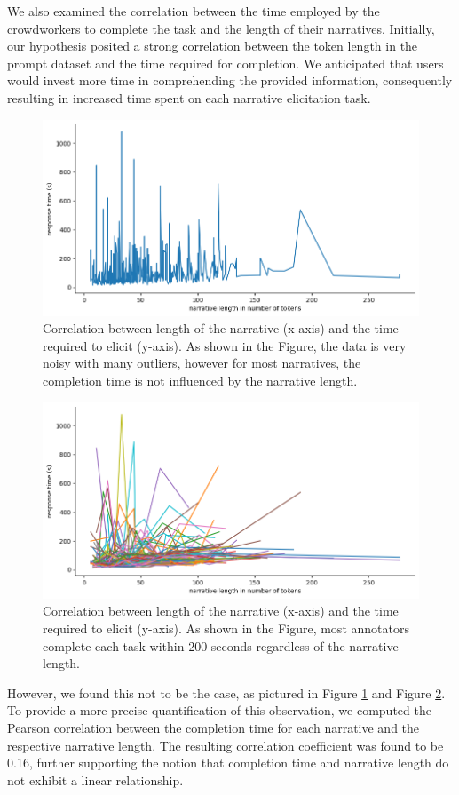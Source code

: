 We also examined the correlation between the time employed by the crowdworkers to complete the task and the length of their narratives. Initially, our hypothesis posited a strong correlation between the token length in the prompt dataset and the time required for completion. We anticipated that users would invest more time in comprehending the provided information, consequently resulting in increased time spent on each narrative elicitation task.
\begin{figure}[!htbp]
    \centering
    \includegraphics[width=1\linewidth]{assets//imgs/dataset-pearson-correlation.png}
    \caption{Correlation between length of the narrative (x-axis) and the time required to elicit (y-axis). As shown in the Figure, the data is very noisy with many outliers, however for most narratives, the completion time is not influenced by the narrative length.}
    \label{fig:dataset-pearson-correlation}
\end{figure}
\begin{figure}[!htbp]
    \centering
        \includegraphics[width=1\linewidth]{assets//imgs/dataset-overall-correlation-workers.png}
        \caption{Correlation between length of the narrative (x-axis) and the time required to elicit (y-axis). As shown in the Figure, most annotators complete each  task within 200 seconds regardless of the narrative length.}
        \label{fig:dataset-overall-correlation-workers}
\end{figure}
However, we found this not to be the case, as pictured in Figure \ref{fig:dataset-pearson-correlation} and Figure \ref{fig:dataset-overall-correlation-workers}. To provide a more precise quantification of this observation, we computed the Pearson correlation between the completion time for each narrative and the respective narrative length. The resulting correlation coefficient was found to be 0.16, further supporting the notion that completion time and narrative length do not exhibit a linear relationship.

